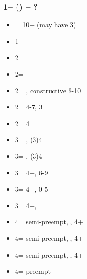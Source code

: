 \documentclass[12pt, a4paper]{article}
\begin{document}
\subsubsection*{1\spades -- (\dbl) -- ?}
\begin{itemize}
    \item \rdbl = 10+ (may have 3\spades)
    \item 1\nt = \trsf{ 2\clubs}
    \item 2\clubs = \trsf{2\diams}
    \item 2\diams = \trsf{2\hearts}
    \item 2\hearts = \trsf{2\spades}, constructive 8-10
    \item 2\spades = 4-7, 3\spades
    \item 2\nt = 4\spades \invp
    \item 3\clubs = \clubs, (3)4\spades \invp
    \item 3\diams = \diams, (3)4\spades \invp
    \item 3\hearts = 4+\spades, 6-9
    \item 3\spades = 4+\spades, 0-5
    \item 3\nt =  4+\spades, \lsf \vimp
    \item 4\clubs = semi-preempt, \clubs, 4+\spades
    \item 4\diams = semi-preempt, \diams, 4+\spades
    \item 4\hearts = semi-preempt, \hearts, 4+\spades
    \item 4\spades = preempt
\end{itemize}

\end{document}
